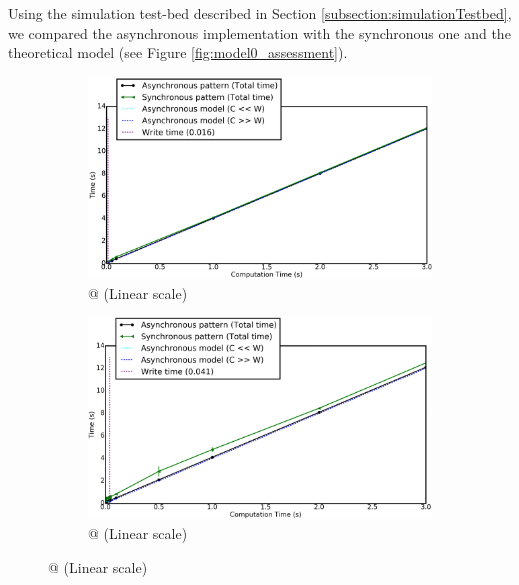 		Using the simulation test-bed described in Section \ref{subsection:simulationTestbed}, we compared the asynchronous implementation with the synchronous one and the theoretical model (see Figure \ref{fig:model0_assessment}).\\
			\begin{figure}[!h]
				\centering
				\begin{subfigure}[b]{0.475\textwidth}
					\centering
					\includegraphics[width=\textwidth]{charts/model0_workstation_8core.png}
					\caption[\targetPlatformLaptop \space @ \targetPlatformLaptopFrequency\space (Linear scale)]%
					{{\small \targetPlatformLaptop \space @ \targetPlatformLaptopFrequency\space (Linear scale)}}
					\label{fig:model0_assessment_laptop}
				\end{subfigure}
				\hfill
				\begin{subfigure}[b]{0.475\textwidth}
					\centering
					\includegraphics[width=\textwidth]{charts/model0_hpc_2Proc_1IoDevice.png}
					\caption[]%
					{{\small \targetPlatformHpc \space @ \targetPlatformHpcFrequency\space (Linear scale)}}

\end{subfigure}
\end{figure}
